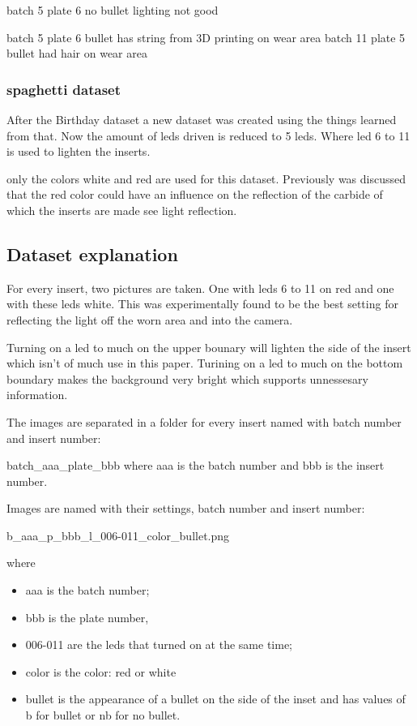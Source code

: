 batch 5 plate 6 no bullet lighting not good

batch 5 plate 6 bullet has string from 3D printing on wear area
batch 11 plate 5 bullet had hair on wear area

\subsubsection{spaghetti dataset}

After the Birthday dataset a new dataset was created using the things learned from that. Now the amount of leds driven is reduced to 5 leds. Where led 6 to 11 is used to lighten the inserts. 

only the colors white and red are used for this dataset. Previously was discussed that the red color could have an influence on the reflection of the carbide of which the inserts are made see light reflection.

\subsection{Dataset explanation}

For every insert, two pictures are taken. One with leds 6 to 11 on red and one with these leds white. This was experimentally found to be the best setting for reflecting the light off the worn area and into the camera. 

Turning on a led to much on the upper bounary will lighten the side of the insert which isn't of much use in this paper. Turining on a led to much on the bottom boundary makes the background very bright which supports unnessesary information.



The images are separated in a folder for every insert named with batch number and insert number:

batch\_aaa\_plate\_bbb where aaa is the batch number and bbb is the insert number.

Images are named with their settings, batch number and insert number:

b\_aaa\_p\_bbb\_l\_006-011\_color\_bullet.png 

where 

\begin{itemize}
\item aaa is the batch number; 
\item bbb is the plate number, 
\item 006-011 are the leds that turned on at the same time; 
\item color is the color: red or white
\item bullet is the appearance of a bullet on the side of the inset and has values of b for bullet or nb for no bullet.
\end{itemize}


